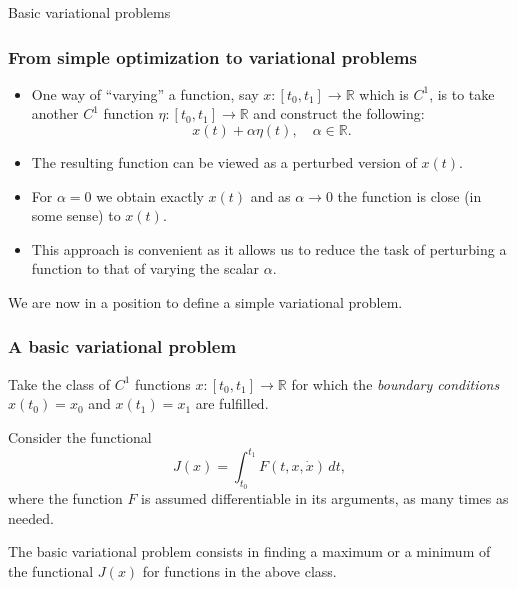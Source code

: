 \documentclass[10pt]{beamer}
\theoremstyle{definition}
\begin{document}
\begin{section}{Basic variational problems}
\begin{frame}[fragile]
\frametitle{From simple optimization to variational problems}
\begin{itemize}\itemsep1em
\item One way of ``varying'' a function, say $ x : [t_0,t_1] \rightarrow \mathbb{R} $ which is $ C^1 $, is to take another $ C^1 $ function $ \eta : [t_0,t_1] \rightarrow \mathbb{R} $ and construct the following:\[ x(t)+\alpha \eta(t),\quad \alpha \in \mathbb{R}. \]
\item The resulting function can be viewed as a perturbed version of $ x(t) $. 
\item For $ \alpha = 0 $ we obtain exactly $ x(t) $ and as $ \alpha \rightarrow 0 $ the function is close (in some sense) to $ x(t) $.
\item This approach is convenient as it allows us to reduce the task of perturbing a function to that of varying the scalar $ \alpha $.
\end{itemize}\pause \bigskip

\alert{We are now in a position to define a simple variational problem.}
\end{frame}

\begin{frame}[fragile]
\frametitle{A basic variational problem}
Take the class of $ C^1 $ functions $ x : [t_0,t_1] \rightarrow \mathbb{R} $ for which the \emph{boundary conditions} $ x(t_0)=x_0 $ and $ x(t_1)=x_1 $ are fulfilled.\bigskip

Consider the functional \begin{equation}
J(x) = \int_{t_0}^{t_1} F(t,x,\dot{x})\,dt,
\label{eq:ObjFunctional}
\end{equation}
where the function $ F $ is assumed differentiable in its arguments, as many times as needed.\bigskip

The basic variational problem consists in finding a maximum or a minimum of the functional $ J(x) $ for functions in the above class.
\end{frame}

\end{section}
\end{document}
